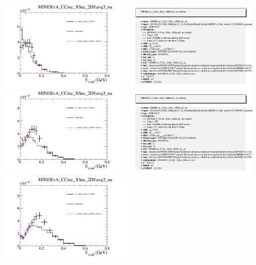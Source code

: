 \documentclass{article}
\begin{document}
\centering
\includegraphics[width=0.49\textwidth]{figures/cc_visEq3_xsec_CV_WithErr_slice_2_comp.png}
\includegraphics[width=0.49\textwidth]{figures/cc_visEq3_xsec_CV_WithErr_info.png}
\centering
\includegraphics[width=0.49\textwidth]{figures/cc_visEq3_xsec_CV_WithErr_slice_3_comp.png}
\includegraphics[width=0.49\textwidth]{figures/cc_visEq3_xsec_CV_WithErr_info.png}
\centering
\includegraphics[width=0.49\textwidth]{figures/cc_visEq3_xsec_CV_WithErr_slice_4_comp.png}
\end{document}
